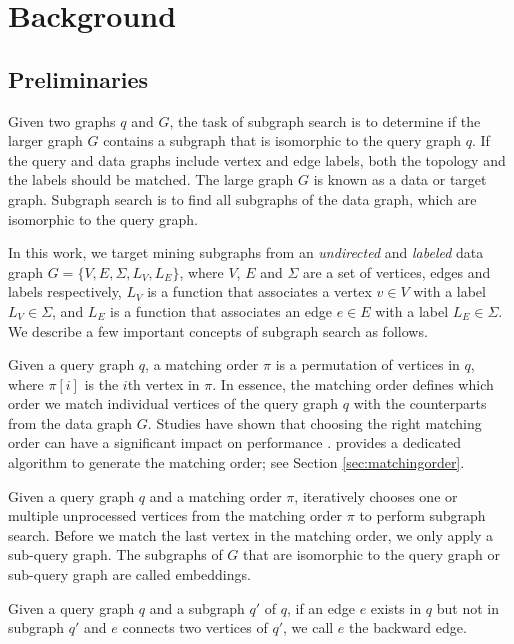 \section{Background}

\subsection{Preliminaries}
Given two graphs $q$ and $G$, the task of subgraph search is to determine if the larger graph $G$ contains a subgraph that is isomorphic
to the query graph $q$. If the query and data graphs include vertex and edge labels, both the topology and the labels should be matched. The large graph $G$ is known as a data or target graph.  Subgraph search is to find all subgraphs  of the data graph, which are isomorphic to the query graph.

In this work, we target mining subgraphs from an \emph{undirected} and \emph{labeled} data graph $G=\{V,E,\Sigma,L_V,L_E\}$, where $V$, $E$
and $\Sigma$ are a set of vertices, edges and labels respectively,  $L_V$ is a function that associates a vertex $v \in V$ with a label
$L_V \in \Sigma$, and $L_E$ is a function that associates an edge $e \in E$ with a label $L_E \in \Sigma$. We describe a few important concepts of subgraph search as follows.

 Given a query graph $q$, a matching order $\pi$ is a permutation of vertices in $q$, where $\pi[i]$ is the
$i$th vertex in $\pi$. In essence, the matching order defines which order we match individual vertices of the query graph $q$ with the
counterparts from the data graph $G$. Studies have shown that choosing the right matching order can have a significant impact on
performance \cite{bi2016efficient,sun2020subgraph,sun2020rapidmatch,guo2020gpu}.  \SystemName provides a dedicated algorithm to generate
the matching order; see Section \ref {sec:matchingorder}.

 Given a query graph $q$ and a matching order $\pi$, \SystemName iteratively chooses  one or multiple
unprocessed vertices from the matching order $\pi$ to perform subgraph search. Before we match the last vertex in the matching order, we
only apply a sub-query graph. The subgraphs of $G$ that are isomorphic to the query graph or sub-query graph are called embeddings.

 Given a query graph $q$ and a subgraph $q'$ of $q$, if an edge $e$ exists in $q$ but not in subgraph $q'$ and
$e$ connects two vertices of $q'$, we call $e$ the backward edge.

